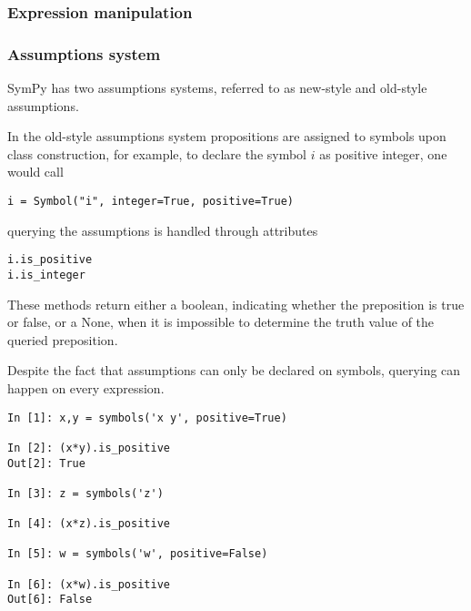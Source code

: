 
\subsubsection{Expression manipulation}








\subsubsection{Assumptions system}



SymPy has two assumptions systems, referred to as new-style and old-style assumptions.

In the old-style assumptions system propositions are assigned to symbols
upon class construction, for example, to declare the symbol $i$ as positive integer,
one would call

\begin{verbatim}
i = Symbol("i", integer=True, positive=True)
\end{verbatim}

querying the assumptions is handled through attributes

\begin{verbatim}
i.is_positive
i.is_integer
\end{verbatim}

These methods return either a boolean, indicating whether the preposition is true or false,
or a None, when it is impossible to determine the truth value of the queried preposition.

Despite the fact that assumptions can only be declared on symbols, querying can
happen on every expression.

\begin{verbatim}
In [1]: x,y = symbols('x y', positive=True)

In [2]: (x*y).is_positive
Out[2]: True

In [3]: z = symbols('z')

In [4]: (x*z).is_positive

In [5]: w = symbols('w', positive=False)

In [6]: (x*w).is_positive
Out[6]: False
\end{verbatim}

